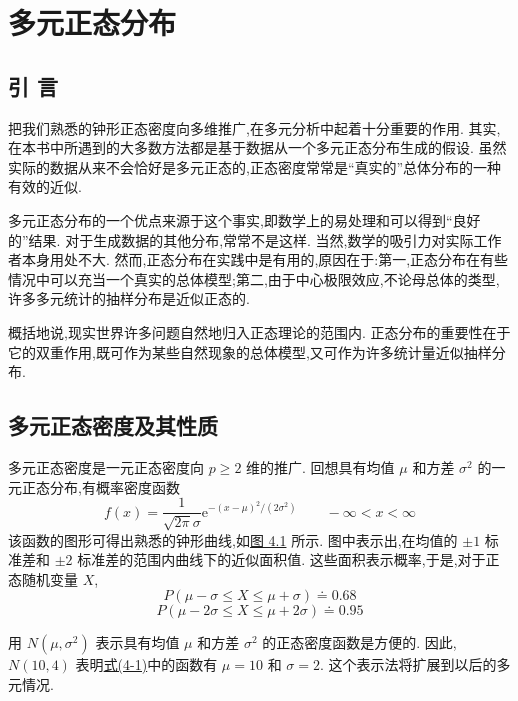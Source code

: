 \chapter{多元正态分布}
\label{chap:4}

\section{引 言}
\label{sec:4.1}

把我们熟悉的钟形正态密度向多维推广,在多元分析中起着十分重要的作用. 其实,在本书中所遇到的大多数方法都是基于数据从一个多元正态分布生成的假设. 虽然实际的数据从来不会恰好是多元正态的,正态密度常常是“真实的”总体分布的一种有效的近似.

多元正态分布的一个优点来源于这个事实,即数学上的易处理和可以得到“良好的”结果. 对于生成数据的其他分布,常常不是这样. 当然,数学的吸引力对实际工作者本身用处不大. 然而,正态分布在实践中是有用的,原因在于:第一,正态分布在有些情况中可以充当一个真实的总体模型;第二,由于中心极限效应,不论母总体的类型,许多多元统计的抽样分布是近似正态的.

概括地说,现实世界许多问题自然地归入正态理论的范围内. 正态分布的重要性在于它的双重作用,既可作为某些自然现象的总体模型,又可作为许多统计量近似抽样分布.

\section{多元正态密度及其性质}
\label{sec:4.2}

多元正态密度是一元正态密度向 $p\geqslant 2$ 维的推广. 回想具有均值 $\mu$ 和方差 $\sigma^{2}$ 的一元正态分布,有概率密度函数
\label{eq:4-1}
\begin{equation}
f(x)=\frac{1}{\sqrt{2\pi}\sigma}\mathrm{e}^{-(x-\mu)^{2}/(2\sigma^{2})}\qquad -\infty<x<\infty
\tag{4-1}
\end{equation}
该函数的图形可得出熟悉的钟形曲线,如\hyperref[fig:4.1]{图 4.1} 所示. 图中表示出,在均值的 $\pm 1$ 标准差和 $\pm 2$ 标准差的范围内曲线下的近似面积值. 这些面积表示概率,于是,对于正态随机变量 $X$,
\[
P(\mu-\sigma\leqslant X\leqslant \mu+\sigma)\doteq 0.68
\]
\[
P(\mu-2\sigma\leqslant X\leqslant \mu+2\sigma)\doteq 0.95
\]

\begin{mvfigure}
\label{fig:4.1}
\end{mvfigure}

用 $N(\mu,\sigma^{2})$ 表示具有均值 $\mu$ 和方差 $\sigma^{2}$ 的正态密度函数是方便的. 因此,$N(10,4)$ 表明\hyperref[eq:4-1]{式(4-1)}中的函数有 $\mu=10$ 和 $\sigma=2$. 这个表示法将扩展到以后的多元情况.
